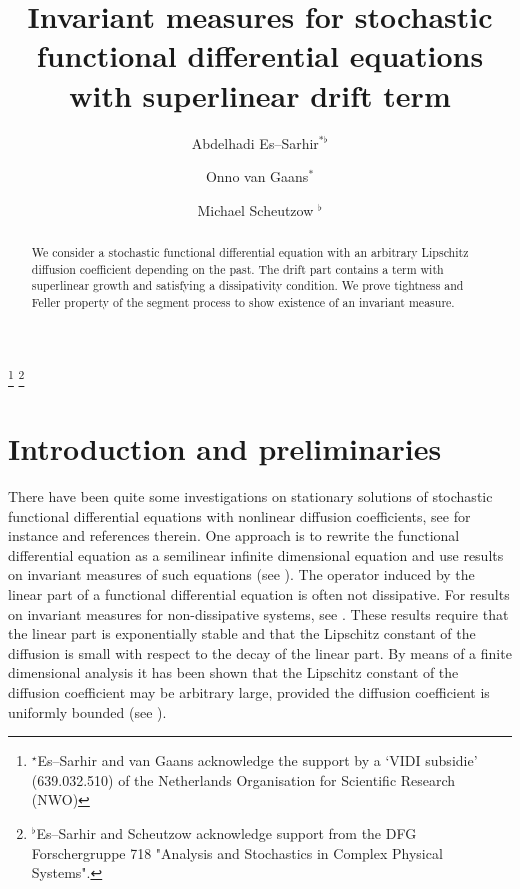 \documentclass[11pt,reqno,draft]{amsart}
\begin{document}

\title[Invariant measures for SFDE's with superlinear drift terms ]{Invariant measures for stochastic functional differential equations with superlinear drift term}
\author[A. Es--Sarhir]{Abdelhadi Es--Sarhir$^{\ast\flat}$}
\author[O. van Gaans]{Onno van Gaans$^\ast$}
\author[M. Scheutzow]{Michael Scheutzow $^\flat$}
\address{Technische Universit\"at Berlin, Fakult\"at II, Institut f\"ur Mathematik, Sekr. Ma 7-5\newline Stra{\ss}e des 17. Juni 136, D-10623 Berlin, Germany}
 
\address{Universiteit Leiden, Mathematisch Instituut, \newline Postbus 9512, 2300 RA Leiden, The Netherlands}

\thanks{$^\star$Es--Sarhir and van Gaans acknowledge the support by a `VIDI subsidie' (639.032.510) of the Netherlands Organisation for Scientific Research (NWO)}
\thanks{$^\flat$Es--Sarhir and Scheutzow acknowledge support
from the DFG Forschergruppe 718 "Analysis and Stochastics in Complex
Physical Systems".}



\begin{abstract} We consider a stochastic functional differential
equation with an arbitrary Lipschitz diffusion coefficient depending
on the past. The drift part contains a term with superlinear growth
and satisfying a dissipativity condition. We prove tightness and
Feller property of the segment process to show existence of an
invariant measure.
\end{abstract}

\maketitle
\section{Introduction and preliminaries}
\noindent There have been quite some investigations on stationary
solutions of stochastic functional differential equations with
nonlinear diffusion coefficients, see for instance
\cite{bakhtin,chow,scheutzow} and references therein. One approach
is to rewrite the functional differential equation as a semilinear
infinite dimensional equation and use results on invariant measures
of such equations (see \cite{DaZa:96}). The operator induced by the
linear part of a functional differential equation is often not
dissipative. For results on invariant measures for non-dissipative
systems, see \cite{bonaccorsi,vangaans}. These results require that
the linear part is exponentially stable and that the Lipschitz
constant of the diffusion is small with respect to the decay of the
linear part. By means of a finite dimensional analysis it has been
shown that the Lipschitz constant of the diffusion coefficient may
be arbitrary large, provided the diffusion coefficient is uniformly
bounded (see \cite{reiss}).
\end{document}
